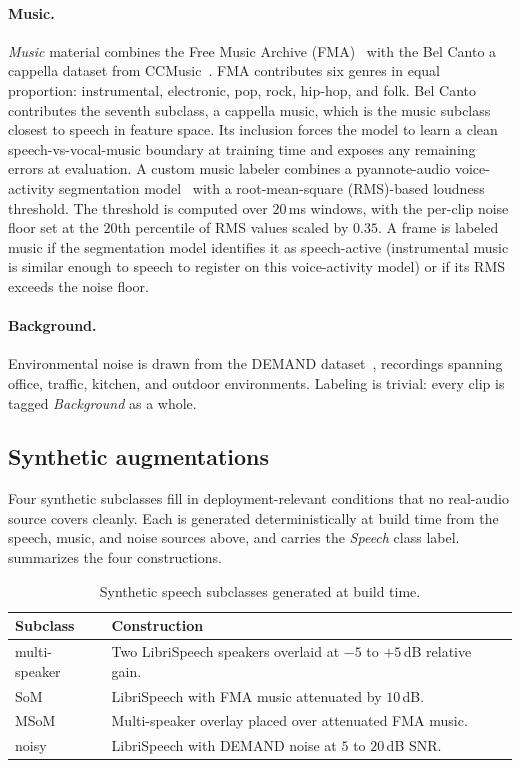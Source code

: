 \paragraph{Music.}
\emph{Music} material combines the Free Music Archive (FMA)~\cite{defferrard2017fma} with the Bel Canto a cappella dataset from CCMusic~\cite{zhou2025ccmusic}.
FMA contributes six genres in equal proportion: instrumental, electronic, pop, rock, hip-hop, and folk.
Bel Canto contributes the seventh subclass, a cappella music, which is the music subclass closest to speech in feature space.
Its inclusion forces the model to learn a clean speech-vs-vocal-music boundary at training time and exposes any remaining errors at evaluation.
A custom music labeler combines a pyannote-audio voice-activity segmentation model~\cite{bredin2023pyannote,plaquet2023diarization} with a root-mean-square (RMS)-based loudness threshold.
The threshold is computed over $20$\,ms windows, with the per-clip noise floor set at the $20$th percentile of RMS values scaled by $0.35$.
A frame is labeled music if the segmentation model identifies it as speech-active (instrumental music is similar enough to speech to register on this voice-activity model) or if its RMS exceeds the noise floor.

\paragraph{Background.}
Environmental noise is drawn from the DEMAND dataset~\cite{thiemann2013demand}, recordings spanning office, traffic, kitchen, and outdoor environments.
Labeling is trivial: every clip is tagged \emph{Background} as a whole.

\subsection{Synthetic augmentations}
\label{sec:dataset_augmentations}

Four synthetic subclasses fill in deployment-relevant conditions that no real-audio source covers cleanly.
Each is generated deterministically at build time from the speech, music, and noise sources above, and carries the \emph{Speech} class label.
 summarizes the four constructions.

\begin{table}[h]
\centering
\begin{tabular}{lp{}}
\toprule
\textbf{Subclass} & \textbf{Construction} \\
\midrule
multi-speaker & Two LibriSpeech speakers overlaid at $-5$ to $+5$\,dB relative gain. \\
SoM           & LibriSpeech with FMA music attenuated by $10$\,dB. \\
MSoM          & Multi-speaker overlay placed over attenuated FMA music. \\
noisy         & LibriSpeech with DEMAND noise at $5$ to $20$\,dB SNR. \\
\bottomrule
\end{tabular}
	\caption{Synthetic speech subclasses generated at build time.}
\label{tab:dataset_synthetic_augs}
\end{table}


